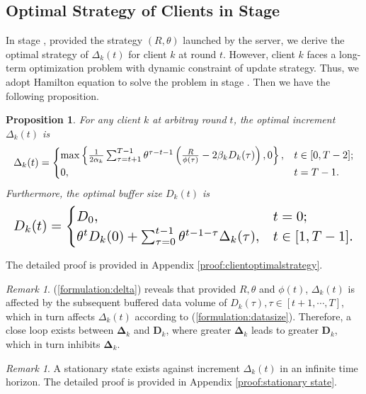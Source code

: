 \documentclass{article}
\theoremstyle{plain}
\newtheorem{proposition}[theorem]{Proposition}
\theoremstyle{definition}
\theoremstyle{remark}
\newtheorem{remark}[theorem]{Remark}
\begin{document}
\subsection{Optimal Strategy of Clients in Stage \uppercase\expandafter{}}
In stage \uppercase\expandafter{}, provided the strategy $(R, \theta)$ launched by the server, we derive the optimal strategy of $\Delta_k(t)$ for client $k$ at round $t$.
However, client $k$ faces a long-term optimization problem with dynamic constraint of update strategy.
Thus, we adopt Hamilton equation to solve the problem in stage \uppercase\expandafter{}. Then we have the following proposition.
\begin{proposition}
  \label{proposition:clientoptimalstrategy}
  For any client $k$ at arbitray round $t$, the optimal increment $\Delta_k(t)$ is
  \begin{equation}
    \resizebox{\columnwidth}{!}{$
      \Delta_k(t) = 
      \begin{cases}
        \max\left\{\frac{1}{2 \alpha_k} \sum_{\tau = t + 1}^{T - 1} \theta^{\tau - t - 1} \left(\frac{R}{\phi(\tau)} - 2\beta_k D_k(\tau)\right), 0\right\}, & t \in [0, T-2]; \\
        \displaystyle 0, & t = T-1.
      \end{cases}    
    $}
  \label{formulation:delta}
  \end{equation}
  Furthermore, the optimal buffer size $D_k(t)$ is
  \begin{equation}
    \resizebox{\columnwidth}{!}{$
      D_k(t) = 
      \begin{cases}
        \displaystyle D_0, & t = 0; \\
        \theta^{t} D_k(0) + \sum_{\tau = 0}^{t-1} \theta^{t-1-\tau} \Delta_k(\tau), & t \in [1, T-1].
      \end{cases}
    $}
  \label{formulation:datasize}
  \end{equation}
\end{proposition}
The detailed proof is provided in Appendix \ref{proof:clientoptimalstrategy}.
\begin{remark}
  (\ref{formulation:delta}) reveals that provided $R, \theta$ and $\phi(t)$, $\Delta_k(t)$ is affected by the subsequent buffered data volume of $D_k(\tau), \tau \in [t+1, \cdots, T]$, which in turn affects $\Delta_k(t)$ according to (\ref{formulation:datasize}).
  Therefore, a close loop exists between $\boldsymbol{\Delta}_k$ and $\boldsymbol{D}_k$, where greater $\boldsymbol{\Delta}_k$ leads to greater $\boldsymbol{D}_k$, which in turn inhibits $\boldsymbol{\Delta}_k$.
\end{remark}
\begin{remark}
  A stationary state exists against increment $\Delta_k(t)$ in an infinite time horizon.
  The detailed proof is provided in Appendix \ref{proof:stationary state}.
  \label{remark:stationary state}
\end{remark}
\end{document}
